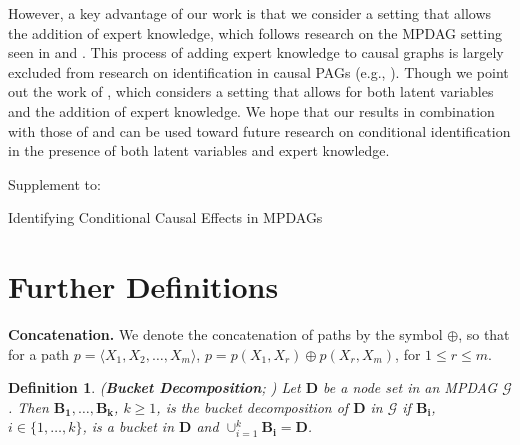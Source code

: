 \documentclass[11pt]{article}
\newtheorem{definition}[theorem]{Definition}
\newcommand{\mb}[1]{\mathbf{#1}}
\newcommand{\g}[1][G]{\mathcal{#1}}
\begin{document}
However, a key advantage of our work is that we consider a setting that allows the addition of expert knowledge, which follows research on the MPDAG setting seen in \cite{perkovic2020identifying} and \cite{laplante2024conditional}. This process of adding expert knowledge to causal graphs is largely excluded from research on identification in causal PAGs (e.g., \citealp{zhang2008causal, jaber2022causal}). Though we point out the work of \cite{venkateswaran2024towards}, which considers a setting that allows for both latent variables and the addition of expert knowledge. We hope that our results in combination with those of \cite{venkateswaran2024towards} and \cite{laplante2024conditional} can be used toward future research on conditional identification in the presence of both latent variables and expert knowledge.





















%
%


\newpage
\appendix

\centerline{\LARGE{Supplement to:}}
\centerline{\LARGE{Identifying Conditional Causal Effects in MPDAGs}}


\tableofcontents




\section{Further Definitions}
\label{app:defs}

\textbf{Concatenation.}
We denote the concatenation of paths by the symbol $\oplus$, so that for a path $p = \langle X_1,X_2, \dots, X_m \rangle$, $p = p(X_1, X_r) \oplus p(X_r, X_m)$, for $1\le r\le m$.

\begin{definition}
\label{def:bucket-decomp}
{\normalfont (\textbf{Bucket Decomposition}; \citealp{perkovic2020identifying})}
    Let $\mb{D}$ be a node set in an MPDAG $\g$. Then $\mb{B_1}, \dots, \mb{B_k}$, $k \ge 1$, is the bucket decomposition of $\mb{D}$ in $\g$ if $\mb{B_i}$, $i \in \{ 1, \dots, k\}$, is a bucket in $\mb{D}$ and $\cup_{i=1}^k \mb{B_i} = \mb{D}$.
\end{definition}
\end{document}
